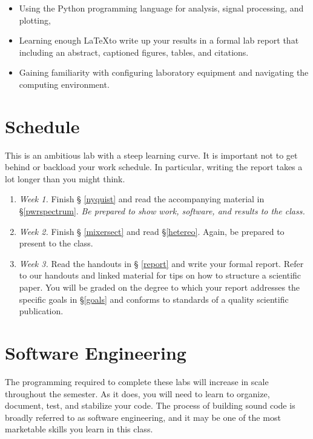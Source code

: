 \documentclass[11pt,preprint]{aastex}
\begin{document}
\begin{itemize}

\item Using the Python programming language for analysis, signal processing, and plotting,

\item Learning enough \LaTeX to write up your results in a formal lab
  report that including an abstract, captioned figures, tables, and citations.

\item Gaining familiarity with configuring laboratory equipment 
and navigating the computing environment.

\end{itemize}

\section{Schedule}

\noindent
This is an ambitious lab with a steep learning curve.
It is important not to get behind or backload your work schedule.
In particular, writing the report takes a lot longer than you might think.
\begin{enumerate}

\item {\it Week 1.} Finish \S
  \ref{nyquist} and read the accompanying
  material in \S \ref{pwrspectrum}. {\it Be prepared to show work, 
  software, and results to the class.}

\item {\it Week 2.} Finish \S
  \ref{mixersect} and read \S \ref{hetereo}. Again, be prepared
  to present to the class.

\item {\it Week 3.} Read the handouts in \S
  \ref{report} and write your formal report.  Refer to
  our handouts and linked material for tips on how to structure
  a scientific paper. You will be graded on the degree to which your
  report addresses the specific goals in \S\ref{goals} and conforms to
  standards of a quality scientific publication.

\end{enumerate}

\section{Software Engineering}

\noindent
The programming required to complete these labs will increase in scale throughout the semester.
As it does, you will need to learn to organize, document, test, and stabilize your code.  The process
of building sound code is broadly referred to as software engineering, and
it may be one of the most marketable skills you learn in this class.
\end{document}
